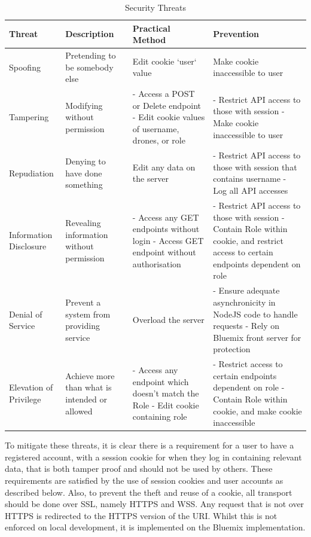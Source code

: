 \documentclass{article}
\begin{document}
\begin{table}[ht]  
\caption{Security Threats\label{tab:SecurityThreats}}
\centering
\renewcommand{\arraystretch}{1.5}
\begin{tabularx}{\textwidth}{>{\centering}p{1.5cm} >{\centering}X X X}
Threat & Description & Practical Method & Prevention \\ [0.5ex]
\hline
Spoofing & Pretending to be somebody else & Edit cookie `user` value & Make cookie inaccessible to user \\
Tampering & Modifying without permission & - Access a POST or Delete endpoint \newline - Edit cookie values of username, drones, or role & - Restrict API access to those with session \newline - Make cookie inaccessible to user \\ 
Repudiation & Denying to have done something & Edit any data on the server & - Restrict API access to those with session that contains username \newline - Log all API accesses \\
Information Disclosure & Revealing information without permission & - Access any GET endpoints without login \newline - Access GET endpoint without authorisation & - Restrict API access to those with session \newline - Contain Role within cookie, and restrict access to certain endpoints dependent on role \\
Denial of Service & Prevent a system from providing service & Overload the server & - Ensure adequate asynchronicity in NodeJS code to handle requests \newline - Rely on Bluemix front server for protection \\
Elevation of Privilege & Achieve more than what is intended or allowed & - Access any endpoint which doesn't match the Role \newline - Edit cookie containing role & - Restrict access to certain endpoints dependent on role \newline - Contain Role within cookie, and make cookie inaccessible \\
\hline
\end{tabularx}
\end{table}
To mitigate these threats, it is clear there is a requirement for a user to have a registered account, with a session cookie for when they log in containing relevant data, that is both tamper proof and should not be used by others. These requirements are satisfied by the use of session cookies and user accounts as described below. Also, to prevent the theft and reuse of a cookie, all transport should be done over SSL, namely HTTPS and WSS. Any request that is not over HTTPS is redirected to the HTTPS version of the URI. Whilst this is not enforced on local development, it is implemented on the Bluemix implementation.
\end{document}
